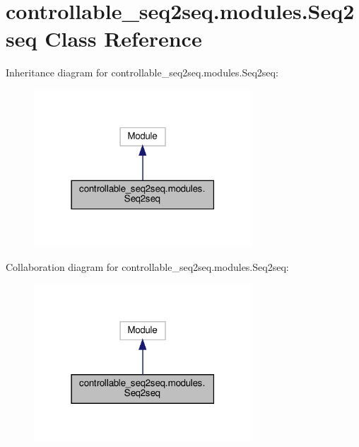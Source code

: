 \hypertarget{classcontrollable__seq2seq_1_1modules_1_1Seq2seq}{}\section{controllable\+\_\+seq2seq.\+modules.\+Seq2seq Class Reference}
\label{classcontrollable__seq2seq_1_1modules_1_1Seq2seq}


Inheritance diagram for controllable\+\_\+seq2seq.\+modules.\+Seq2seq\+:
\nopagebreak
\begin{figure}[H]
\begin{center}
\leavevmode
\includegraphics[width=231pt]{classcontrollable__seq2seq_1_1modules_1_1Seq2seq__inherit__graph}
\end{center}
\end{figure}


Collaboration diagram for controllable\+\_\+seq2seq.\+modules.\+Seq2seq\+:
\nopagebreak
\begin{figure}[H]
\begin{center}
\leavevmode
\includegraphics[width=231pt]{classcontrollable__seq2seq_1_1modules_1_1Seq2seq__coll__graph}
\end{center}
\end{figure}
